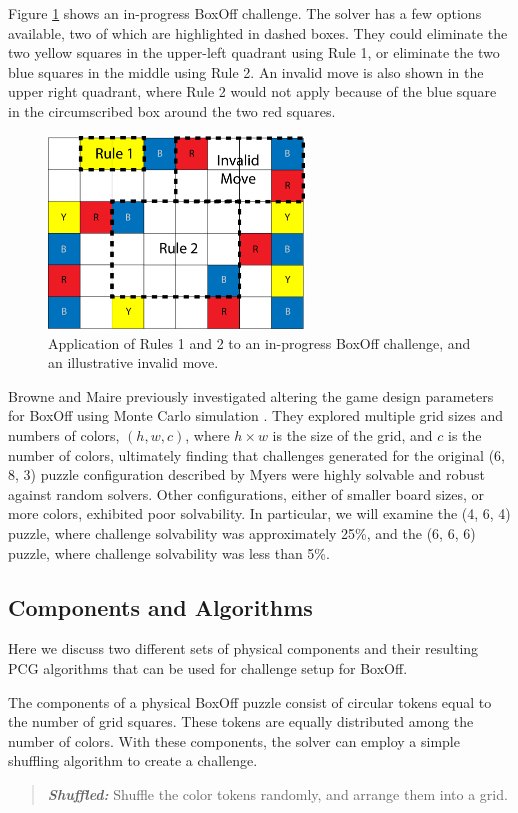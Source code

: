 \documentclass[journal]{IEEEtran}
\begin{document}
Figure \ref{fig:boxoffrules} shows an in-progress BoxOff challenge. The solver has a few options available, two of which are highlighted in dashed boxes. They could eliminate the two yellow squares in the upper-left quadrant using Rule 1, or eliminate the two blue squares in the middle using Rule 2. An invalid move is also shown in the upper right quadrant, where Rule 2 would not apply because of the blue square in the circumscribed box around the two red squares.

\begin{figure}[t]
\centering
\includegraphics[width=6.8cm]{figure2.png}
\caption{Application of Rules 1 and 2 to an in-progress BoxOff challenge, and an illustrative invalid move.}
\label{fig:boxoffrules}
\end{figure}


Browne and Maire previously investigated altering the game design parameters for BoxOff using Monte Carlo simulation \cite{MCPUZZLE}. They explored multiple grid sizes and numbers of colors, $(h, w, c)$, where $h \times w$ is the size of the grid, and $c$ is the number of colors, ultimately finding that challenges generated for the original (6, 8, 3) puzzle configuration described by Myers were highly solvable and robust against random solvers. Other configurations, either of smaller board sizes, or more colors, exhibited poor solvability. In particular, we will examine the (4, 6, 4) puzzle, where challenge solvability was approximately 25\%, and the (6, 6, 6) puzzle, where challenge solvability was less than 5\%.

%
%
%
%
%
%

\subsection{Components and Algorithms}
\noindent
Here we discuss two different sets of physical components and their resulting PCG algorithms that can be used for challenge setup for BoxOff. 

The components of a physical BoxOff puzzle consist of circular tokens equal to the number of grid squares. These tokens are equally distributed among the number of colors. 
With these components, the solver can employ a simple shuffling algorithm to create a challenge.
\begin{quote}
    {\it \bf Shuffled:} Shuffle the color tokens randomly, and arrange them into a grid.
\end{quote}
\end{document}
